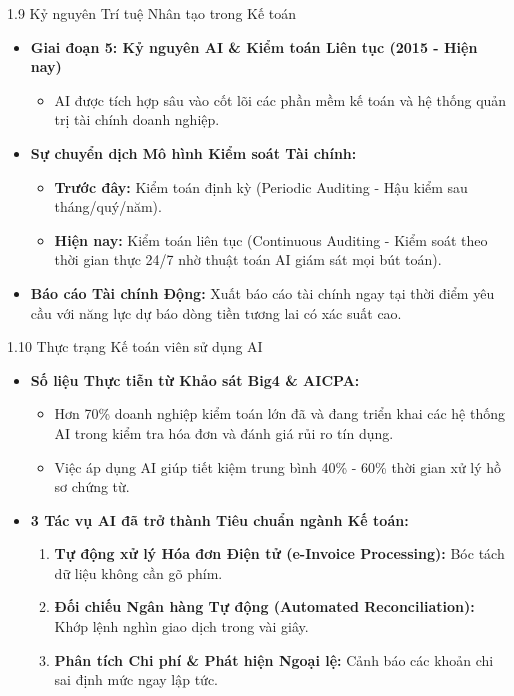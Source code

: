 \documentclass[aspectratio=169]{beamer}
\begin{document}
\begin{frame}{1.9 Kỷ nguyên Trí tuệ Nhân tạo trong Kế toán}
    \begin{itemize}
        \item \textbf{Giai đoạn 5: Kỷ nguyên AI \& Kiểm toán Liên tục (2015 - Hiện nay)}
        \begin{itemize}
            \item AI được tích hợp sâu vào cốt lõi các phần mềm kế toán và hệ thống quản trị tài chính doanh nghiệp.
        \end{itemize}
        \item \textbf{Sự chuyển dịch Mô hình Kiểm soát Tài chính:}
        \begin{itemize}
            \item \textbf{Trước đây:} Kiểm toán định kỳ (Periodic Auditing - Hậu kiểm sau tháng/quý/năm).
            \item \textbf{Hiện nay:} Kiểm toán liên tục (Continuous Auditing - Kiểm soát theo thời gian thực 24/7 nhờ thuật toán AI giám sát mọi bút toán).
        \end{itemize}
        \item \textbf{Báo cáo Tài chính Động:} Xuất báo cáo tài chính ngay tại thời điểm yêu cầu với năng lực dự báo dòng tiền tương lai có xác suất cao.
    \end{itemize}
\end{frame}

\begin{frame}{1.10 Thực trạng Kế toán viên sử dụng AI}
    \begin{itemize}
        \item \textbf{Số liệu Thực tiễn từ Khảo sát Big4 \& AICPA:}
        \begin{itemize}
            \item Hơn 70\% doanh nghiệp kiểm toán lớn đã và đang triển khai các hệ thống AI trong kiểm tra hóa đơn và đánh giá rủi ro tín dụng.
            \item Việc áp dụng AI giúp tiết kiệm trung bình 40\% - 60\% thời gian xử lý hồ sơ chứng từ.
        \end{itemize}
        \item \textbf{3 Tác vụ AI đã trở thành Tiêu chuẩn ngành Kế toán:}
        \begin{enumerate}
            \item \textbf{Tự động xử lý Hóa đơn Điện tử (e-Invoice Processing):} Bóc tách dữ liệu không cần gõ phím.
            \item \textbf{Đối chiếu Ngân hàng Tự động (Automated Reconciliation):} Khớp lệnh nghìn giao dịch trong vài giây.
            \item \textbf{Phân tích Chi phí \& Phát hiện Ngoại lệ:} Cảnh báo các khoản chi sai định mức ngay lập tức.
        \end{enumerate}
    \end{itemize}
\end{frame}
\end{document}
